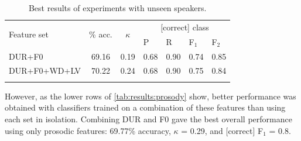\documentclass[a4paper]{article}
\begin{document}
	\begin{table}[!b]
			\centering
			\caption[Best results of experiments with unseen speakers]{Best results of experiments with unseen speakers.%
			}
			\begin{tabularx}{\columnwidth}{lccXXXX}			
			
			\toprule
			\multirow{2}{*}{Feature set} & \multirow{2}{*}{\% acc.} & \multirow{2}{*}{$\kappa$} & \multicolumn{4}{c}{[correct] class} \\
			 \cmidrule(lr){4-7}
			& & & P & R & F$_1$ & F$_2$ \\
			\midrule
	
DUR+F0	&	69.16	&	0.19	&	0.68	&	0.90	&	0.74	&	0.85	\\
DUR+F0+WD+LV	&	70.22	&	0.24	&	0.68	&	0.90	&	0.75	&	0.84	\\
	
			\bottomrule
			\label{tab:results:speakers}
			\end{tabularx}
	\end{table}
	

	
	
		
		
		However, as the lower rows of \cref{tab:results:prosody} show, better performance was obtained with classifiers trained on a combination of these features than using each set in isolation. 
		Combining DUR and F0 %
		gave the best overall performance using only prosodic features: 
		69.77\% accuracy, $\kappa$ = 0.29, and [correct] F$_1$ = 0.8.
		
\end{document}
